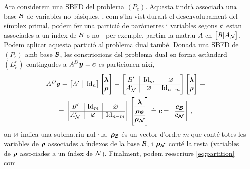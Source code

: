 Ara considerem una \hyperref[defi:SBFD]{SBFD} del problema $(P_e)$. Aquesta tindrà associada una base $\mathcal{B}$ de variables no bàsiques, i com s'ha vist durant el desenvolupament del símplex primal, podem fer una partició de paràmetres i variables segons si estan associades a un índex de $\mathcal{B}$ o no---per exemple, partim la matriu $A$ en $\left[B\vert A_{\mathcal{N}}\right]$. Podem aplicar aquesta partició al problema dual també. Donada una SBFD de $(P_e)$ amb base $\mathcal{B}$, les constriccions del problema dual en forma estàndard $(D^e_{\tilde{e}})$ contingudes a $A^D\boldsymbol{y} = \boldsymbol{c}$ es particionen així,
\begin{multline}\label{eq:partition}
	A^D\vb{y} =
	\left[\begin{array}{{@{}c|c@{}}}
		A' & \Id_n
	\end{array}\right]
	\left[\begin{array}{{@{}c@{}}}
		\vb{\lambda}\\
		\hline
		\vb{\rho}
	\end{array}\right] 
	=
	\left[\begin{array}{{@{}c|cc@{}}}
		B'		& \Id_m 		  &	\varnothing	\\
		\hline
		A_\N' 	& \varnothing & \Id_{n-m}
	\end{array}\right]
	\left[\begin{array}{{@{}c@{}}}
		\vb{\lambda}\\
		\hline
		\vb{\rho}
	\end{array}\right] 
	=\\
	=
	\left[\begin{array}{{@{}c|c|c@{}}}
		B'		& \Id_m 		  &	\varnothing	\\
		\hline
		A_\N' 	& \varnothing & \Id_{n-m}
	\end{array}\right]
	\left[\begin{array}{{@{}c@{}}}
		\vb{\lambda}\\
		\hline
		\vb{\rho_\B}\\
		\hline
		\vb{\rho_\N}
	\end{array}\right]
	\doteq \vb{c}
	=
	\left[\begin{array}{{@{}c@{}}}
		\vb{c_\B}\\
		\hline
		\vb{c_\N}
	\end{array}\right]\,,
\end{multline}
on $\varnothing$ indica una submatriu nul·la, $\boldsymbol{\rho_{\mathcal{B}}}$ és un vector d'ordre $m$ que conté totes les variables de $\boldsymbol{\rho}$ associades a índexos de la base $\mathcal{B}$, i $\boldsymbol{\rho_{\mathcal{N}}}$ conté la resta (variables de $\boldsymbol{\rho}$ associades a un índex de $\mathcal{N}$). Finalment, podem reescriure \eqref{eq:partition} com
